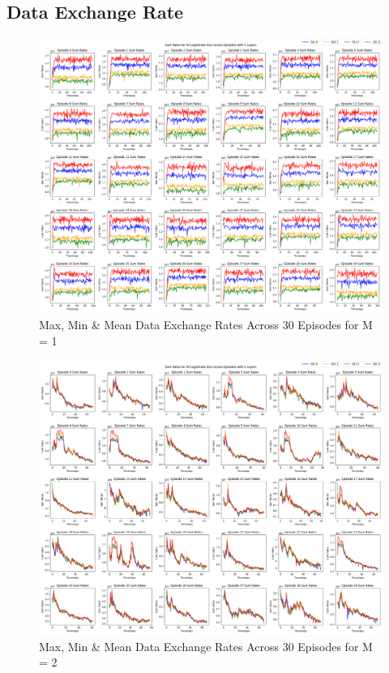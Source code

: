 \subsection{Data Exchange Rate}
\begin{figure} [ht!]
    \centering
    \includegraphics[width=0.8\linewidth]{figures/test8_without_trajectory/1_layers_sum_rates.png}
    \caption{Max, Min \& Mean Data Exchange Rates Across 30 Episodes for M = 1}
    \label{fig:data_rate_1_layer_30_ep}
\end{figure}
\begin{figure}
    \centering
    \includegraphics[width=0.8\linewidth]{figures/test8_without_trajectory/2_layers_sum_rates.png}
    \caption{Max, Min \& Mean Data Exchange Rates Across 30 Episodes for M = 2}
    \label{fig:data_rate_2_layers_30_ep}
\end{figure}
